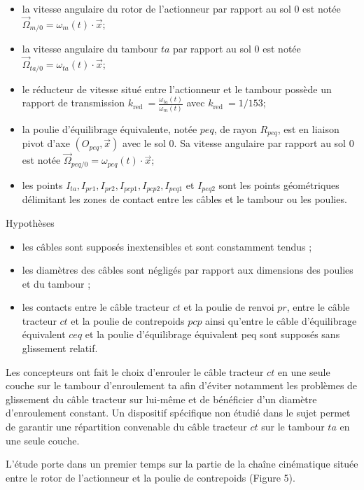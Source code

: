 \documentclass[10pt]{article}
\begin{document}
\begin{itemize}
  \item[-] la vitesse angulaire du rotor de l'actionneur par rapport au sol 0 est notée $\vec{\Omega}_{m / 0}=\omega_{m}(t) \cdot \vec{x}$;
  \item[-] la vitesse angulaire du tambour $t a$ par rapport au sol 0 est notée $\vec{\Omega}_{t a / 0}=\omega_{t a}(t) \cdot \vec{x}$;
  \item[-] le réducteur de vitesse situé entre l'actionneur et le tambour possède un rapport de transmission $k_{\text {red }}=\frac{\omega_{t a}(t)}{\omega_{m}(t)}$ avec $k_{\text {red }}=1 / 153$;
  \item[-] la poulie d'équilibrage équivalente, notée $p e q$, de rayon $R_{p e q}$, est en liaison pivot d'axe $\left(O_{p e q}, \vec{x}\right)$ avec le sol 0. Sa vitesse angulaire par rapport au sol 0 est notée $\vec{\Omega}_{p e q / 0}=\omega_{p e q}(t) \cdot \vec{x}$;
  \item[-] les points $I_{t a}, I_{p r 1}, I_{p r 2}, I_{p c p 1}, I_{p c p 2}, I_{p e q 1}$ et $I_{p e q 2}$ sont les points géométriques délimitant les zones de contact entre les câbles et le tambour ou les poulies.
\end{itemize}

Hypothèses

\begin{itemize}
  \item[-] les câbles sont supposés inextensibles et sont constamment tendus ;
  \item[-] les diamètres des câbles sont négligés par rapport aux dimensions des poulies et du tambour ;
  \item[-] les contacts entre le câble tracteur $c t$ et la poulie de renvoi $p r$, entre le câble tracteur $c t$ et la poulie de contrepoids $p c p$ ainsi qu'entre le câble d'équilibrage équivalent $c e q$ et la poulie d'équilibrage équivalent peq sont supposés sans glissement relatif.
\end{itemize}

Les concepteurs ont fait le choix d'enrouler le câble tracteur $c t$ en une seule couche sur le tambour d'enroulement ta afin d'éviter notamment les problèmes de glissement du câble tracteur sur lui-même et de bénéficier d'un diamètre d'enroulement constant. Un dispositif spécifique non étudié dans le sujet permet de garantir une répartition convenable du câble tracteur $c t$ sur le tambour $t a$ en une seule couche.

L'étude porte dans un premier temps sur la partie de la chaîne cinématique située entre le rotor de l'actionneur et la poulie de contrepoids (Figure 5).
\end{document}
